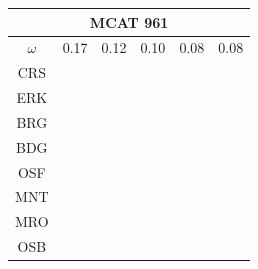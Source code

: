 \documentclass[12pt]{article}
\begin{document}
\begin{landscape}
\begin{figure}
\vspace*{-2.1cm}
\hspace*{5cm}
\begin{minipage}[c]{0.3\textwidth}
\hspace*{-5cm}
\begin{tabular}{|c|c|c|c|c|c|}%
         \hline \multicolumn{6}{|c|}{MCAT 961} \\ \hline
         $\omega$&0.17&0.12&0.10&0.08&0.08\\ \hline %
        CRS&\cellcolor[HTML]{E41A1C}&\cellcolor[HTML]{E41A1C}&\cellcolor[HTML]{E41A1C}&\cellcolor[HTML]{E41A1C}&\cellcolor[HTML]{E41A1C}\\ \hline %
        ERK&\cellcolor[HTML]{E41A1C}&\cellcolor[HTML]{E41A1C}&\cellcolor[HTML]{E41A1C}&\cellcolor[HTML]{E41A1C}&\cellcolor[HTML]{E41A1C}\\ \hline %
        BRG&\cellcolor[HTML]{377EB8}&\cellcolor[HTML]{377EB8}&\cellcolor[HTML]{377EB8}&\cellcolor[HTML]{377EB8}&\cellcolor[HTML]{377EB8}\\ \hline %
        BDG&\cellcolor[HTML]{377EB8}&\cellcolor[HTML]{377EB8}&\cellcolor[HTML]{377EB8}&\cellcolor[HTML]{377EB8}&\cellcolor[HTML]{377EB8}\\ \hline %
        OSF&\cellcolor[HTML]{4DAF4A}&\cellcolor[HTML]{4DAF4A}&\cellcolor[HTML]{377EB8}&\cellcolor[HTML]{377EB8}&\cellcolor[HTML]{4DAF4A}\\ \hline %
        MNT&\cellcolor[HTML]{4DAF4A}&\cellcolor[HTML]{4DAF4A}&\cellcolor[HTML]{4DAF4A}&\cellcolor[HTML]{4DAF4A}&\cellcolor[HTML]{4DAF4A}\\ \hline %
        MRO&\cellcolor[HTML]{4DAF4A}&\cellcolor[HTML]{4DAF4A}&\cellcolor[HTML]{4DAF4A}&\cellcolor[HTML]{4DAF4A}&\cellcolor[HTML]{4DAF4A}\\ \hline %
        OSB&\cellcolor[HTML]{984EA3}&\cellcolor[HTML]{984EA3}&\cellcolor[HTML]{4DAF4A}&\cellcolor[HTML]{984EA3}&\cellcolor[HTML]{984EA3}\\ \hline %

\end{tabular}
\end{minipage}
\end{figure}
\end{landscape}
\end{document}
